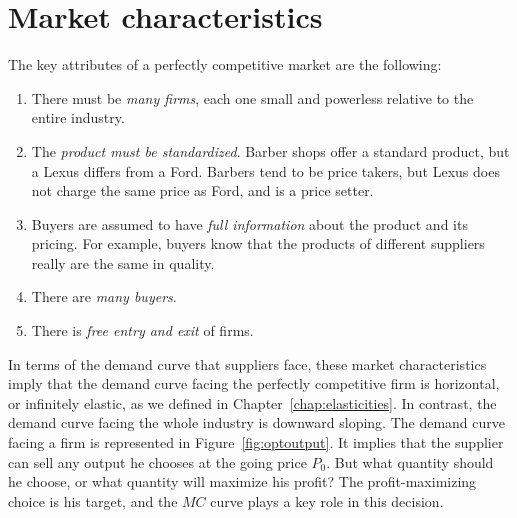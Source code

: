 \section{Market characteristics}\label{sec:ch9sec2}

The key attributes of a perfectly competitive market are the following:

\begin{enumerate}
	\item There must be \textit{many firms}, each one small and powerless
	relative to the entire industry.
	
	\item The \textit{product must be standardized}. Barber shops offer a
	standard product, but a Lexus differs from a Ford. Barbers tend to be price
	takers, but Lexus does not charge the same price as Ford, and is a price
	setter.
	
	\item Buyers are assumed to have \textit{full information} about the product
	and its pricing. For example, buyers know that the products of different
	suppliers really are the same in quality.
	
	\item There are \textit{many buyers}.
	
	\item There is \textit{free entry and exit} of firms.
\end{enumerate}

In terms of the demand curve that suppliers face, these market
characteristics imply that the demand curve facing the perfectly competitive
firm is horizontal, or infinitely elastic, as we defined in Chapter~\ref{chap:elasticities}.
In contrast, the demand curve facing the whole industry
is downward sloping. The demand curve facing a firm is represented in 
Figure~\ref{fig:optoutput}. It implies that the supplier can sell any output he
chooses at the going price $P_{0}$. But what quantity should he choose, or
what quantity will maximize his profit? The profit-maximizing choice is his
target, and the $MC$ curve plays a key role in this decision.